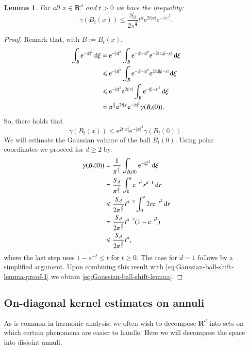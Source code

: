 \documentclass[preprint,12pt]{elsarticle}
\newtheorem{lemma}{Lemma}
\theoremstyle{remark}
\newcommand{\D}{\,\textup{d}}
\newcommand{\la}{\langle}
\newcommand{\ra}{\rangle}
\renewcommand{\leq}{\leqslant}
\renewcommand{\geq}{\geqslant}
\newcommand{\R}{\mathbf R}
\newcommand{\e}{\mathrm{e}} %
\begin{document}
\begin{lemma}\label{lem:Gaussian-ball-shift-lemma}
  For all $x \in \R^d$ and $t > 0$ we have the inequality:
  \begin{equation}\label{eq:Gaussian-ball-shift-lemma}
    \gamma(B_t(x)) \leq  \frac{S_d}{2 \pi^{\frac{d}{2}}} t^d \e^{2t|x|} \e^{-|x|^2}. 
  \end{equation}
\end{lemma}
\begin{proof}
  Remark that, with $B := B_t(x)$,
  \begin{align*}
    \int_B \e^{-|\xi|^2} \D\xi &= \e^{-|x|^2} \int_{B} \e^{-|\xi -
      x|^2} \e^{-2 \la x, \xi - x \ra} \D\xi\\
    &\leq \e^{-|x|^2} \int_{B} \e^{-|\xi - x|^2} \e^{2 |x| |\xi - x|}
    \D\xi\\
    &\leq \e^{-|x|^2} \e^{2 t|x|} \int_{B} \e^{-|\xi - x|^2} \D\xi\\
    &= \pi^{\frac{d}2} \e^{2 t|x|} \e^{-|x|^2} \gamma(B_t(0)).
  \end{align*}
  So, there holds that
  \begin{equation}\label{eq:Gaussian-ball-shift-lemma-proof-1}
    \gamma(B_t(x)) \leq \e^{2 t|x|} \e^{-|x|^2} \gamma(B_t(0)).
  \end{equation}
  We will estimate the Gaussian volume of the ball $B_t(0)$. Using polar coordinates
  we proceed for $d \geq 2$ by: 
  \begin{align*}
    \gamma(B_t(0)) &= \frac1{\pi^{\frac{d}2}} \int_{B_t(0)} \e^{-|\xi|^2} \D\xi\\
    &= \frac{S_d}{\pi^{\frac{d}2}} \int_0^t \e^{-r^2} r^{d - 1} \D{r}\\
    &\leq \frac{S_d}{2 \pi^{\frac{d}2}} t^{d-2} \int_0^t 2r \e^{-r^2} \D{r}\\
    &= \frac{S_d}{2 \pi^{\frac{d}2}} t^{d-2} (1-\e^{-t^2})\\
    &\leq \frac{S_d}{2 \pi^{\frac{d}2}} t^d,
  \end{align*}
  where the last step uses $1 - \e^{-t} \leq t$ for $t \geq 0$. The case
  for $d = 1$ follows by a simplified argument. Upon combining this
  result with \eqref{eq:Gaussian-ball-shift-lemma-proof-1} we obtain
  \eqref{eq:Gaussian-ball-shift-lemma}.
\end{proof}

\subsection{On-diagonal kernel estimates on annuli}
As is common in harmonic analysis, we often wish to decompose
$\R^d$ into sets on which certain phenomena are easier to handle. Here
we will decompose the space into disjoint annuli. 
\end{document}
